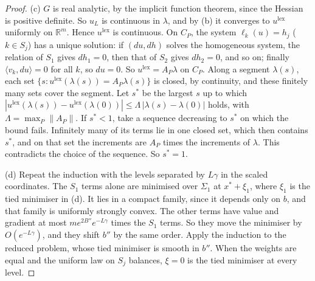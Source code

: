 \documentclass[11pt]{article}
\theoremstyle{definition}\newtheorem{definition}[theorem]{Definition}\newtheorem{remark}[theorem]{Remark}\newtheorem{example}[theorem]{Example}\newtheorem{problem}[theorem]{Open problem}\crefname{problem}{Problem}{Problems}
\newcommand{\R}{\mathbb R}
\begin{document}
\begin{proof}
(c) $G$ is real analytic, by the implicit function theorem, since the Hessian is positive definite. So $u_L$ is continuous in $\lambda$, and by (b) it converges to $u^{\mathrm{lex}}$ uniformly on $\R^m$. Hence $u^{\mathrm{lex}}$ is continuous. On $C_P$, the system $\ell_k(u)=h_j$ ($k\in S_j$) has a unique solution: if $(du,dh)$ solves the homogeneous system, the relation of $S_1$ gives $dh_1=0$, then that of $S_2$ gives $dh_2=0$, and so on; finally $\langle v_k,du\rangle=0$ for all $k$, so $du=0$. So $u^{\mathrm{lex}}=A_P\lambda$ on $C_P$. Along a segment $\lambda(s)$, each set $\{s:u^{\mathrm{lex}}(\lambda(s))=A_P\lambda(s)\}$ is closed, by continuity, and these finitely many sets cover the segment. Let $s^*$ be the largest $s$ up to which $|u^{\mathrm{lex}}(\lambda(s))-u^{\mathrm{lex}}(\lambda(0))|\le\Lambda\,|\lambda(s)-\lambda(0)|$ holds, with $\Lambda=\max_P\|A_P\|$. If $s^*<1$, take a sequence decreasing to $s^*$ on which the bound fails. Infinitely many of its terms lie in one closed set, which then contains $s^*$, and on that set the increments are $A_P$ times the increments of $\lambda$. This contradicts the choice of the sequence. So $s^*=1$.

(d) Repeat the induction with the levels separated by $L\gamma$ in the scaled coordinates. The $S_1$ terms alone are minimised over $\Sigma_1$ at $x^*+\xi_1$, where $\xi_1$ is the tied minimiser in (d). It lies in a compact family, since it depends only on $b$, and that family is uniformly strongly convex. The other terms have value and gradient at most $me^{2B''}e^{-L\gamma}$ times the $S_1$ terms. So they move the minimiser by $O(e^{-L\gamma})$, and they shift $b''$ by the same order. Apply the induction to the reduced problem, whose tied minimiser is smooth in $b''$. When the weights are equal and the uniform law on $S_j$ balances, $\xi=0$ is the tied minimiser at every level.
\end{proof}
\end{document}
